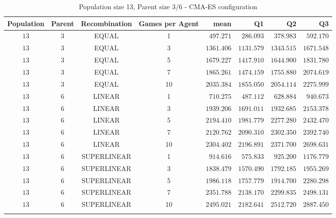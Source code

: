 \begin{table}[H]
\centering
\small
\begin{tabular}{c c c c r r r r}
Population & Parent & Recombination & Games per Agent & mean & Q1 & Q2 & Q3\\
\hline
$13$ & $3$ & EQUAL & 1 & $497.271$ & $286.093$ & $378.983$ & $592.170$\\
$13$ & $3$ & EQUAL & 3 & $1361.406$ & $1131.579$ & $1343.515$ & $1671.548$\\
$13$ & $3$ & EQUAL & 5 & $1679.227$ & $1417.910$ & $1644.900$ & $1831.780$\\
$13$ & $3$ & EQUAL & 7 & $1865.261$ & $1474.159$ & $1755.880$ & $2074.619$\\
\hdashline
$13$ & $3$ & EQUAL & 10 & $2035.384$ & $1855.050$ & $2054.114$ & $2275.999$\\
\hdashline
$13$ & $6$ & LINEAR & 1 & $710.275$ & $487.112$ & $628.884$ & $940.673$\\
$13$ & $6$ & LINEAR & 3 & $1939.206$ & $1691.011$ & $1932.685$ & $2153.378$\\
$13$ & $6$ & LINEAR & 5 & $2194.410$ & $1981.779$ & $2277.280$ & $2432.470$\\
$13$ & $6$ & LINEAR & 7 & $2120.762$ & $2090.310$ & $2302.350$ & $2392.740$\\
\hdashline
$13$ & $6$ & LINEAR & 10 & $2304.402$ & $2196.891$ & $2371.700$ & $2698.631$\\
\hdashline
$13$ & $6$ & SUPERLINEAR & 1 & $914.616$ & $575.833$ & $925.200$ & $1176.779$\\
$13$ & $6$ & SUPERLINEAR & 3 & $1838.479$ & $1570.490$ & $1792.185$ & $1955.269$\\
$13$ & $6$ & SUPERLINEAR & 5 & $1986.118$ & $1757.779$ & $1914.700$ & $2280.298$\\
$13$ & $6$ & SUPERLINEAR & 7 & $2351.788$ & $2138.170$ & $2299.835$ & $2498.131$\\
\hdashline
$13$ & $6$ & SUPERLINEAR & 10 & $2495.021$ & $2182.641$ & $2512.720$ & $2887.450$\\
\hdashline
\end{tabular}
\caption{Population size 13, Parent size 3/6 - CMA-ES configuration}
\end{table}


